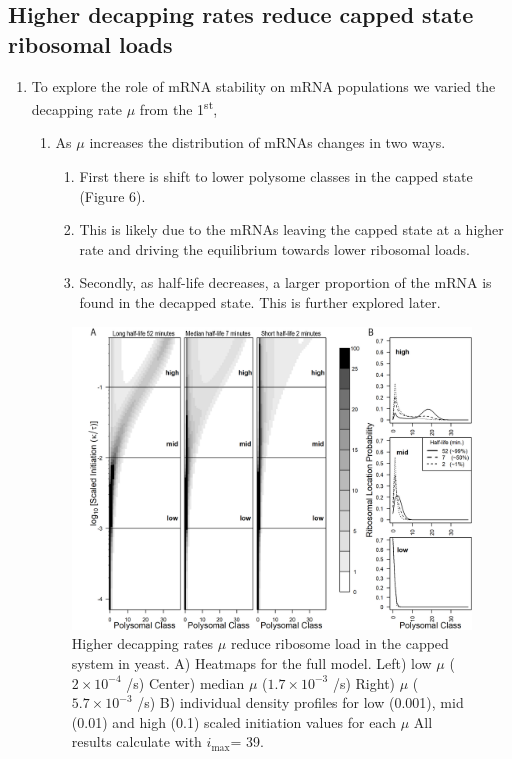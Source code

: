 \documentclass[review]{elsarticle}
\newcommand{\imax}{\ensuremath{{i_{\max}}}\xspace}
\begin{document}
\subsection{Higher decapping rates reduce capped state ribosomal loads }
\begin{enumerate}
\item To explore the role of mRNA stability on mRNA populations we varied the decapping rate $\mu$ from the 1\textsuperscript{st}, 
\begin{enumerate}
  50\textsuperscript{th} and 99\textsuperscript{th} percentile values as determined from  Presnyak 2015.
  \item As $\mu$ increases the distribution of mRNAs changes in two ways. 
  \begin{enumerate}
     \item First there is shift to lower polysome classes in the capped state (Figure 6).
     \item This is likely due to the mRNAs leaving the capped state at a higher rate and driving the equilibrium towards lower ribosomal loads. 
     \item Secondly, as half-life decreases, a larger proportion of the mRNA is found in the decapped state. This is further explored later. 
  \end{enumerate}
\end{enumerate}
\begin{figure}[!ht]
\centering
\includegraphics[width=120mm]{Images/2023-07-09_Figure2_Marking_Rate_range_medianlength_with_labels.png}
\caption{Higher decapping rates $\mu$ reduce ribosome load in the capped system in yeast.  A)  Heatmaps for the full model. Left) low $\mu$ ($2\times 10^{-4}$ /s) Center) median $\mu$ ($1.7\times 10^{-3}$ /s) Right) $\mu$ ($5.7\times 10^{-3}$ /s)  B) individual density profiles for low (0.001), mid (0.01) and high (0.1) scaled initiation values for each $\mu$ All results calculate with \imax = 39.}
\end{figure}
\clearpage


\end{enumerate}
\end{document}

